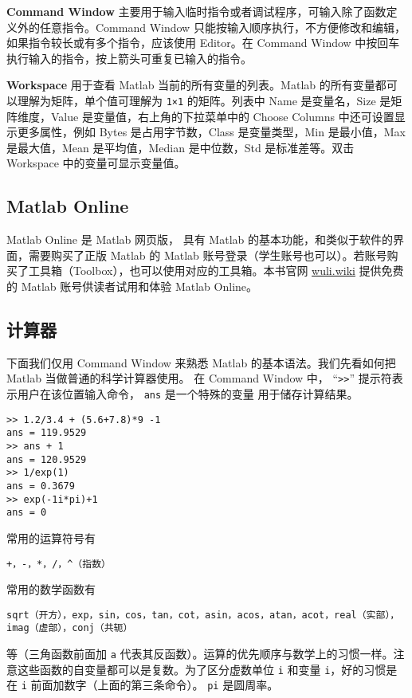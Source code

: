 \textbf{Command Window} 主要用于输入临时指令或者调试程序，可输入除了函数定义外的任意指令。Command Window 只能按输入顺序执行，不方便修改和编辑，如果指令较长或有多个指令，应该使用 Editor。在 Command Window 中按回车执行输入的指令，按上箭头可重复已输入的指令。

\textbf{Workspace} 用于查看 Matlab 当前的所有变量的列表。Matlab 的所有变量都可以理解为矩阵，单个值可理解为 \verb|1×1| 的矩阵。列表中 Name 是变量名，Size 是矩阵维度，Value 是变量值，右上角的下拉菜单中的 Choose Columns 中还可设置显示更多属性，例如 Bytes 是占用字节数，Class 是变量类型，Min 是最小值，Max 是最大值，Mean 是平均值，Median 是中位数，Std 是标准差等。双击 Workspace 中的变量可显示变量值。

\subsection{Matlab Online}
Matlab Online 是 Matlab 网页版， 具有 Matlab 的基本功能，和类似于软件的界面，需要购买了正版 Matlab 的 Matlab 账号登录（学生账号也可以）。若账号购买了工具箱（Toolbox），也可以使用对应的工具箱。本书官网 \href{https://wuli.wiki}{wuli.wiki} 提供免费的 Matlab 账号供读者试用和体验 Matlab Online。

\subsection{计算器}
下面我们仅用 Command Window 来熟悉 Matlab 的基本语法。我们先看如何把 Matlab 当做普通的科学计算器使用。 在 Command Window 中， “\verb|>>|” 提示符表示用户在该位置输入命令， \verb|ans| 是一个特殊的变量 用于储存计算结果。
\begin{lstlisting}[language=matlabC]
>> 1.2/3.4 + (5.6+7.8)*9 -1
ans = 119.9529
>> ans + 1
ans = 120.9529
>> 1/exp(1)
ans = 0.3679
>> exp(-1i*pi)+1
ans = 0
\end{lstlisting}
常用的运算符号有
\begin{lstlisting}[language=matlabC]
+，-，*，/，^（指数）
\end{lstlisting}
常用的数学函数有
\begin{lstlisting}[language=matlabC]
sqrt（开方），exp，sin，cos，tan，cot，asin，acos，atan，acot，real（实部），imag（虚部），conj（共轭）
\end{lstlisting}
等（三角函数前面加 \verb|a| 代表其反函数）。运算的优先顺序与数学上的习惯一样。注意这些函数的自变量都可以是复数。为了区分虚数单位 \verb|i| 和变量 \verb|i|，好的习惯是在 \verb|i| 前面加数字（上面的第三条命令）。 \verb|pi| 是圆周率。


